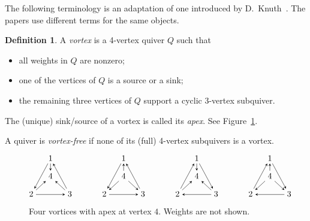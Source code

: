 \documentclass[11pt, letterpaper]{amsart}
\theoremstyle{definition}
\newtheorem{definition}[theorem]{Definition}
\numberwithin{equation}{section}
\begin{document}
The following terminology is an adaptation of one introduced by D.~Knuth~\cite[Section~4]{MR1226891}. 
The papers \cite{brouwer, cameron, moon} use different terms for the same objects.

\begin{definition}
\label{def:vortex}
A \emph{vortex} is a 4-vertex quiver $Q$ such that
\begin{itemize}[leftmargin=.2in]
\item 
all weights in $Q$ are nonzero; 
\item
one of the vertices of $Q$ is a source or a sink; 
\item
the remaining three vertices of $Q$ support a cyclic 3-vertex subquiver. 
\end{itemize}
The (unique) sink/source of a vortex is called its \emph{apex}. 
See Figure~\ref{fig:vortices}. 

A quiver is \emph{vortex-free} if none of its (full) 4-vertex subquivers is a vortex. 
\end{definition}


\begin{figure}[ht]
\vspace{-.15in}
\begin{equation*}
\begin{tikzcd}[arrows={-stealth}, sep=small, cramped]
  & 1 \ar[d] \ar[ddl]  & \\ %
  & 4 & \\ 
  2  \ar[ur] \ar[rr]
  & & 3 \ar[ul] \ar[uul]
\end{tikzcd} 
\hspace{.5in} 
\begin{tikzcd}[arrows={-stealth}, sep=small, cramped]
  & 1  \ar[ddl]  & \\ %
  & 4 \ar[u] \ar[dl] \ar[dr]& \\ 
  2   \ar[rr]
  & & 3  \ar[uul]
\end{tikzcd}
\hspace{.5in} 
\begin{tikzcd}[arrows={-stealth}, sep=small, cramped]
  & 1 \ar[d] \ar[ddr]  & \\ %
  & 4 & \\ 
  2  \ar[ur] \ar[uur]
  & & 3 \ar[ul] \ar[ll]
\end{tikzcd} 
\hspace{.5in} 
\begin{tikzcd}[arrows={-stealth}, sep=small, cramped]
  & 1  \ar[ddr]  & \\ %
  & 4 \ar[u] \ar[dl] \ar[dr]& \\ 
  2   \ar[uur]
  & & 3 \ar[ll]
\end{tikzcd}
\end{equation*}
\vspace{-.15in}
\caption{Four vortices with apex at vertex $4$. Weights are not shown.}
\label{fig:vortices}
\end{figure}
\end{document}
